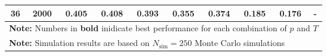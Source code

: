 \begin{landscape}
\begin{table}[p]
\begin{tabular}{cccccccccc}
	 36  & 2000 &       0.405        &           0.408           &            0.393            &           0.355           &            0.374            &         0.185          & \textbf{0.176}           & -                 \\
	\hline
	\hline
    \multicolumn{10}{l}{\textbf{Note:} Numbers in \textbf{bold} inidicate best performance for each combination of $p$ and $T$} \\
    \multicolumn{10}{l}{\textbf{Note:} Simulation results are based on $N_\text{sim} = 250$ Monte Carlo simulations}
    \end{tabular}
    \end{table}
    \egroup
\end{landscape}
    